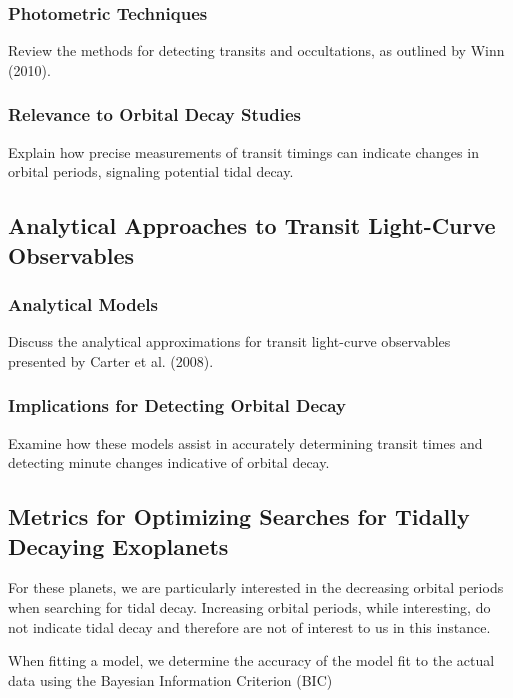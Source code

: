 \documentclass[oneside,12pt]{amsart}
\numberwithin{page}{section}
\begin{document}
\subsubsection{Photometric Techniques}
Review the methods for detecting transits and occultations, as outlined by Winn (2010).

\subsubsection{Relevance to Orbital Decay Studies}
Explain how precise measurements of transit timings can indicate changes in orbital periods, signaling potential tidal decay.





\subsection{Analytical Approaches to Transit Light-Curve Observables}

\subsubsection{Analytical Models}
Discuss the analytical approximations for transit light-curve observables presented by Carter et al. (2008).

\subsubsection{Implications for Detecting Orbital Decay}
Examine how these models assist in accurately determining transit times and detecting minute changes indicative of orbital decay.





\subsection{Metrics for Optimizing Searches for Tidally Decaying Exoplanets}

For these planets, we are particularly interested in the decreasing orbital periods when searching for tidal decay. Increasing orbital periods, while interesting, do not indicate tidal decay and therefore are not of interest to us in this instance. 

When fitting a model, we determine the accuracy of the model fit to the actual data using the Bayesian Information Criterion (BIC) \citep{schwarz1978estimating}
\end{document}
